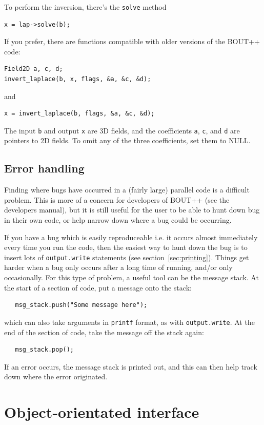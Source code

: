 \documentclass[12pt]{article}
\newcommand{\code}[1]{\texttt{#1}}
\begin{document}
To perform the inversion, there's the \lstinline!solve! method
\begin{lstlisting}
x = lap->solve(b);
\end{lstlisting}

If you prefer, there are functions compatible with older versions
of the BOUT++ code:
\begin{lstlisting}
Field2D a, c, d;
invert_laplace(b, x, flags, &a, &c, &d);
\end{lstlisting}
and
\begin{lstlisting}
x = invert_laplace(b, flags, &a, &c, &d);
\end{lstlisting}
The input \code{b} and output \code{x} are 3D fields, and the coefficients
\code{a}, \code{c}, and \code{d} are pointers to 2D fields. To omit
any of the three coefficients, set them to NULL.

\subsection{Error handling}

Finding where bugs have occurred in a (fairly large) parallel code is a difficult problem.
This is more of a concern for developers of BOUT++ (see the developers manual), but it is still
useful for the user to be able to hunt down bug in their own code, or help narrow down where
a bug could be occurring.

If you have a bug which is easily reproduceable i.e. it occurs almost immediately every time
you run the code, then the easiest way to hunt down the bug is to insert lots of \code{output.write}
statements (see section~\ref{sec:printing}). Things get harder when a bug only occurs after a long time
of running, and/or only occasionally. For this type of problem, a useful tool
can be the message stack.
At the start of a section of code, put a message onto the stack: 
\begin{lstlisting}
   msg_stack.push("Some message here");
\end{lstlisting}
which can also take arguments in \code{printf} format, as with \code{output.write}. At the end of the section of code, take the message off the stack again:
\begin{lstlisting}
   msg_stack.pop();
\end{lstlisting}
If an error occurs, the message stack is printed out, and this can then
help track down where the error originated.

\section{Object-orientated interface}
\label{sec:newapi}
\end{document}
